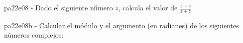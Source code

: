 \documentclass[spanish, 11pt]{exam}
\begin{document}
\begin{questions}
\begin{multicols}{1}
        \end{multicols}
        \question pa22e08 - Dado el siguiente número $z$, calcula el valor de $\frac{z-\overline{z}}{z+\overline{z}}$
        \begin{multicols}{2} 
        \end{multicols}
        \question pa22e08b - Calcular el módulo y el argumento (en radianes) de los siguientes números complejos:
        \begin{multicols}{2} 

\end{multicols}
\end{questions}
\end{document}
